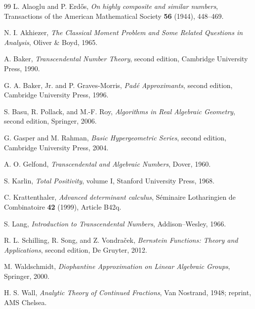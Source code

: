 \documentclass[11pt]{article}
\theoremstyle{definition}
\theoremstyle{remark}
\begin{document}
\begin{thebibliography}{99}
L. Alaoglu and P. Erd\H{o}s,
\emph{On highly composite and similar numbers},
Transactions of the American Mathematical Society \textbf{56} (1944), 448--469.

N. I. Akhiezer,
\emph{The Classical Moment Problem and Some Related Questions in Analysis},
Oliver \& Boyd, 1965.

A. Baker,
\emph{Transcendental Number Theory}, second edition,
Cambridge University Press, 1990.

G. A. Baker, Jr. and P. Graves-Morris,
\emph{Pad\'e Approximants}, second edition,
Cambridge University Press, 1996.

S. Basu, R. Pollack, and M.-F. Roy,
\emph{Algorithms in Real Algebraic Geometry}, second edition,
Springer, 2006.

G. Gasper and M. Rahman,
\emph{Basic Hypergeometric Series}, second edition,
Cambridge University Press, 2004.

A. O. Gelfond,
\emph{Transcendental and Algebraic Numbers},
Dover, 1960.

S. Karlin,
\emph{Total Positivity}, volume I,
Stanford University Press, 1968.

C. Krattenthaler,
\emph{Advanced determinant calculus},
S\'eminaire Lotharingien de Combinatoire \textbf{42} (1999), Article B42q.

S. Lang,
\emph{Introduction to Transcendental Numbers},
Addison--Wesley, 1966.

R. L. Schilling, R. Song, and Z. Vondra\v{c}ek,
\emph{Bernstein Functions: Theory and Applications}, second edition,
De Gruyter, 2012.

M. Waldschmidt,
\emph{Diophantine Approximation on Linear Algebraic Groups},
Springer, 2000.

H. S. Wall,
\emph{Analytic Theory of Continued Fractions},
Van Nostrand, 1948; reprint, AMS Chelsea.
\end{thebibliography}
\end{document}
